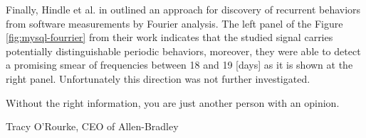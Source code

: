 Finally, Hindle et al. in \cite{citeulike:10377345} outlined an approach for discovery of recurrent behaviors from software 
measurements by Fourier analysis. 
The left panel of the Figure \ref{fig:mysql-fourrier} from their work indicates that the studied signal carries potentially 
distinguishable periodic behaviors, moreover, they were able to detect a promising smear of frequencies between 18 and 19 
[days] as it is shown at the right panel. Unfortunately this direction was not further investigated.

\epigraph{Without the right information, you are just another person with an opinion.}{Tracy O'Rourke, CEO of Allen-Bradley}